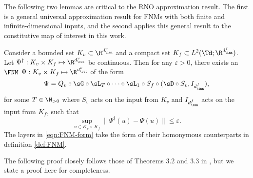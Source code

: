 \documentclass[letterpaper,11pt]{article}
\begin{document}
The following two lemmas are critical to the RNO approximation result. The first is a general universal approximation result for FNMs with both finite and infinite-dimensional inputs, and the second applies this general result to the constitutive map of interest in this work.

\begin{lemma}\label{lem:UA-FNM}
    Consider a bounded set $K_v \subset \R^{d_{\inn}^{v}}$ and a compact set $K_f \subset L^2(\Td;\R^{d_{\inn}^f})$. Let $\Psi^\dagger: K_v \times K_f \mapsto \R^{d_{\out}^v}$ be continuous. Then for any $\varepsilon > 0$, there exists an $\FNM$ $\Psi: K_v \times K_f \mapsto \R^{d_{\out}^{v}}$ of the form 
    \begin{equation}\label{eqn:FNM-form}
        \Psi = Q_v \circ \sG \circ \sL_T \circ \dots \circ \sL_1 \circ S_f \circ (\sD \circ S_v, I_{d_{\inn}^f}),
    \end{equation}
    for some $T \in \N_{>0}$ where $S_v$ acts on the input from $K_v$ and $I_{d_{\inn}^f}$ acts on the input from $K_f$, such that 
    \begin{equation}\label{eqn:FNM_form} \sup_{u \in K_v \times K_f} \|\Psi^\dagger(u) -\Psi(u)\|\leq \varepsilon.\end{equation}
    The layers in \eqref{eqn:FNM-form} take the form of their homonymous counterparts in definition \ref{def:FNM}.
\end{lemma}

The following proof closely follows those of Theorems 3.2 and 3.3 in \cite{huang2024operator}, but we state a proof here for completeness.
\end{document}
